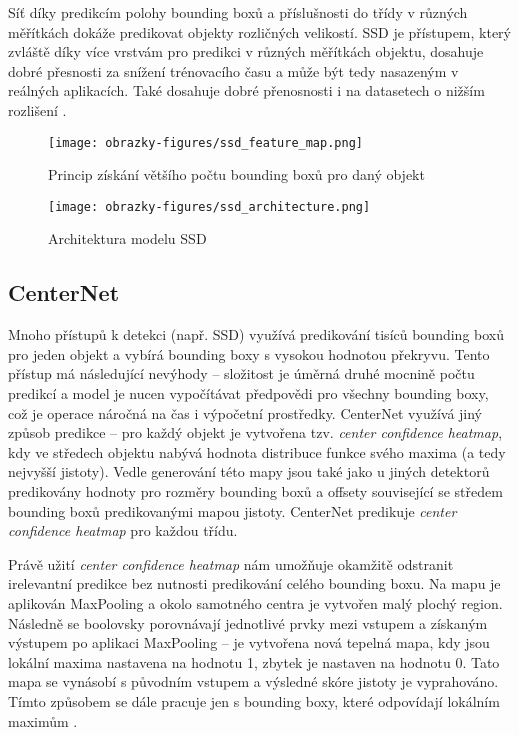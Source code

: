 Síť díky predikcím polohy bounding boxů a příslušnosti do třídy v různých měřítkách dokáže predikovat objekty rozličných velikostí. SSD je přístupem, který zvláště díky více vrstvám pro predikci v různých měřítkách objektu, dosahuje dobré přesnosti za snížení trénovacího času a může být tedy nasazeným v reálných aplikacích. Také dosahuje dobré přenosnosti i na datasetech o nižším rozlišení \cite{SSD, SSDFasterR-CNNComparison}.

\begin{figure}[!htbp]
    \centering
    \texttt{[image: obrazky-figures/ssd\_feature\_map.png]}
    \caption{Princip získání většího počtu bounding boxů pro daný objekt \cite{SSD}}
\end{figure} 

\begin{figure}[!htbp]
    \centering
    \texttt{[image: obrazky-figures/ssd\_architecture.png]}
    \caption{Architektura modelu SSD \cite{SSD}}
\end{figure} 

\subsection*{CenterNet}
Mnoho přístupů k detekci (např. SSD) využívá predikování tisíců bounding boxů pro jeden objekt a vybírá bounding boxy s vysokou hodnotou překryvu. Tento přístup má následující nevýhody -- složitost je úměrná druhé mocnině počtu predikcí a model je nucen vypočítávat předpovědi pro všechny bounding boxy, což je operace náročná na čas i výpočetní prostředky. CenterNet využívá jiný způsob predikce -- pro každý objekt je vytvořena tzv. \textit{center confidence heatmap}, kdy ve středech objektu nabývá hodnota distribuce funkce svého maxima (a tedy nejvyšší jistoty). Vedle generování této mapy jsou také jako u jiných detektorů predikovány hodnoty pro rozměry bounding boxů a offsety související se středem bounding boxů predikovanými mapou jistoty. CenterNet predikuje \textit{center confidence heatmap} pro každou třídu.

Právě užití \textit{center confidence heatmap} nám umožňuje okamžitě odstranit irelevantní predikce bez nutnosti predikování celého bounding boxu. Na mapu je aplikován MaxPooling a okolo samotného centra je vytvořen malý plochý region. Následně se boolovsky porovnávají jednotlivé prvky mezi vstupem a získaným výstupem po aplikaci MaxPooling -- je vytvořena nová tepelná mapa, kdy jsou lokální maxima nastavena na hodnotu 1, zbytek je nastaven na hodnotu 0. Tato mapa se vynásobí s původním vstupem a výsledné skóre jistoty je vyprahováno. Tímto způsobem se dále pracuje jen s bounding boxy, které odpovídají lokálním maximům \cite{CenterNet}.

